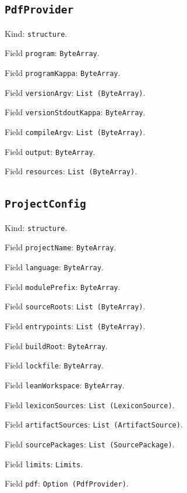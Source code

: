 \documentclass[11pt]{article}
\begin{document}
\subsection*{\texttt{PdfProvider}}
\noindent Kind: \texttt{structure}.\par
\noindent Field \texttt{program}: \texttt{ByteArray}.\par
\noindent Field \texttt{programKappa}: \texttt{ByteArray}.\par
\noindent Field \texttt{versionArgv}: \texttt{List (ByteArray)}.\par
\noindent Field \texttt{versionStdoutKappa}: \texttt{ByteArray}.\par
\noindent Field \texttt{compileArgv}: \texttt{List (ByteArray)}.\par
\noindent Field \texttt{output}: \texttt{ByteArray}.\par
\noindent Field \texttt{resources}: \texttt{List (ByteArray)}.\par
\subsection*{\texttt{ProjectConfig}}
\noindent Kind: \texttt{structure}.\par
\noindent Field \texttt{projectName}: \texttt{ByteArray}.\par
\noindent Field \texttt{language}: \texttt{ByteArray}.\par
\noindent Field \texttt{modulePrefix}: \texttt{ByteArray}.\par
\noindent Field \texttt{sourceRoots}: \texttt{List (ByteArray)}.\par
\noindent Field \texttt{entrypoints}: \texttt{List (ByteArray)}.\par
\noindent Field \texttt{buildRoot}: \texttt{ByteArray}.\par
\noindent Field \texttt{lockfile}: \texttt{ByteArray}.\par
\noindent Field \texttt{leanWorkspace}: \texttt{ByteArray}.\par
\noindent Field \texttt{lexiconSources}: \texttt{List (LexiconSource)}.\par
\noindent Field \texttt{artifactSources}: \texttt{List (ArtifactSource)}.\par
\noindent Field \texttt{sourcePackages}: \texttt{List (SourcePackage)}.\par
\noindent Field \texttt{limits}: \texttt{Limits}.\par
\noindent Field \texttt{pdf}: \texttt{Option (PdfProvider)}.\par
\end{document}
